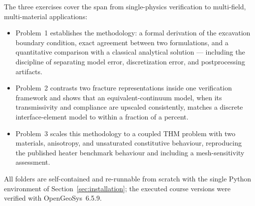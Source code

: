 \documentclass[11pt,a4paper]{tubaf-report}
\begin{document}
The three exercises cover the span from single-physics verification to
multi-field, multi-material applications:
\begin{itemize}[nosep]
  \item Problem~1 establishes the methodology: a formal derivation of the
        excavation boundary condition, exact agreement between two
        formulations, and a quantitative comparison with a classical
        analytical solution --- including the discipline of separating model
        error, discretization error, and postprocessing artifacts.
  \item Problem~2 contrasts two fracture representations inside one
        verification framework and shows that an equivalent-continuum model,
        when its transmissivity and compliance are upscaled consistently,
        matches a discrete interface-element model to within a fraction of a
        percent.
  \item Problem~3 scales this methodology to a coupled THM problem with two
        materials, anisotropy, and unsaturated constitutive behaviour,
        reproducing the published heater benchmark behaviour and including a
        mesh-sensitivity assessment.
\end{itemize}
All folders are self-contained and re-runnable from scratch with the single
Python environment of Section~\ref{sec:installation}; the executed course
versions were verified with OpenGeoSys~6.5.9.
\end{document}
